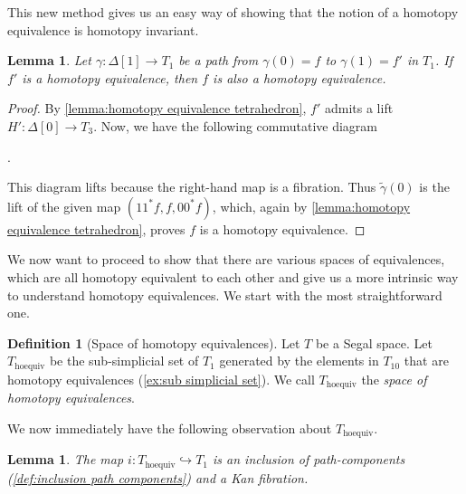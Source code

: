 \documentclass[11pt, a4paper]{amsart}
\newcommand{\hoequiv}{\mathrm{hoequiv}}
\newtheorem{lemma}[equation]{Lemma}
\theoremstyle{definition}
\newtheorem{definition}[equation]{Definition}
\theoremstyle{remark}
\numberwithin{equation}{section}
\begin{document}
This new method gives us an easy way of showing that the notion of a homotopy equivalence is homotopy invariant.
\begin{lemma} \label{lemma:hoequiv arrows}
  Let $\gamma\colon \Delta[1] \to T_1$ be a path from $\gamma(0) = f$ to $\gamma(1) = f'$ in $T_1$. If $f'$ is a homotopy equivalence, then $f$ is also a homotopy equivalence. 
\end{lemma}

\begin{proof}
  By \cref{lemma:homotopy equivalence tetrahedron}, $f'$ admits a lift $H'\colon \Delta[0] \to T_3$. Now, we have the following commutative diagram
  \begin{center}
    .
  \end{center}
  This diagram lifts because the right-hand map is a fibration. Thus $\tilde{\gamma}(0)$ is the lift of the given map $(11^*f,f,00^*f)$, which, again by \cref{lemma:homotopy equivalence tetrahedron}, proves $f$ is a homotopy equivalence. 
\end{proof}
 
 We now want to proceed to show that there are various spaces of equivalences, which are all homotopy equivalent to each other and give us a more intrinsic way to understand homotopy equivalences. We start with the most straightforward one.

\begin{definition}[Space of homotopy equivalences] \label{def:hoequiv space}
  Let $T$ be a Segal space. Let $T_{\hoequiv}$ be the sub-simplicial set of $T_1$ generated by the elements in $T_{10}$ that are homotopy equivalences (\cref{ex:sub simplicial set}). We call $T_{\hoequiv}$ the \emph{space of homotopy equivalences}.
\end{definition}
 
We now immediately have the following observation about $T_{\hoequiv}$.

\begin{lemma} \label{lemma:hoequiv inclusion kan fibration}
  The map $i\colon T_{\hoequiv} \hookrightarrow T_1$ is an inclusion of path-components (\cref{def:inclusion path components}) and a Kan fibration.
\end{lemma}
\end{document}
